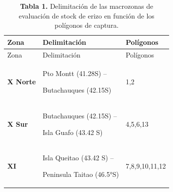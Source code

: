\documentclass[
]{article}
\begin{document}
\begin{longtable}[]{@{}lll@{}}
\caption{\textbf{Tabla 1.} Delimitación de las macrozonas de evaluación
de stock de erizo en función de los polígonos de
captura.}\tabularnewline
\toprule
\begin{minipage}[b]{0.18\columnwidth}\raggedright
Zona\strut
\end{minipage} & \begin{minipage}[b]{0.35\columnwidth}\raggedright
Delimitación\strut
\end{minipage} & \begin{minipage}[b]{0.22\columnwidth}\raggedright
Polígonos\strut
\end{minipage}\tabularnewline
\midrule
\endfirsthead
\toprule
\begin{minipage}[b]{0.18\columnwidth}\raggedright
Zona\strut
\end{minipage} & \begin{minipage}[b]{0.35\columnwidth}\raggedright
Delimitación\strut
\end{minipage} & \begin{minipage}[b]{0.22\columnwidth}\raggedright
Polígonos\strut
\end{minipage}\tabularnewline
\midrule
\endhead
\begin{minipage}[t]{0.18\columnwidth}\raggedright
\textbf{X Norte}\strut
\end{minipage} & \begin{minipage}[t]{0.35\columnwidth}\raggedright
Pto Montt (41.28S) --

Butachauques (42.15S)\strut
\end{minipage} & \begin{minipage}[t]{0.22\columnwidth}\raggedright
1,2\strut
\end{minipage}\tabularnewline
\begin{minipage}[t]{0.18\columnwidth}\raggedright
\textbf{X Sur}\strut
\end{minipage} & \begin{minipage}[t]{0.35\columnwidth}\raggedright
Butachauques (42.15S) --

Isla Guafo (43.42 S)\strut
\end{minipage} & \begin{minipage}[t]{0.22\columnwidth}\raggedright
4,5,6,13\strut
\end{minipage}\tabularnewline
\begin{minipage}[t]{0.18\columnwidth}\raggedright
\textbf{XI}\strut
\end{minipage} & \begin{minipage}[t]{0.35\columnwidth}\raggedright
Isla Queitao (43.42 S) --

Peninsula Taitao (46.5°S)\strut
\end{minipage} & \begin{minipage}[t]{0.22\columnwidth}\raggedright
7,8,9,10,11,12\strut
\end{minipage}\tabularnewline
\bottomrule
\end{longtable}
\end{document}
